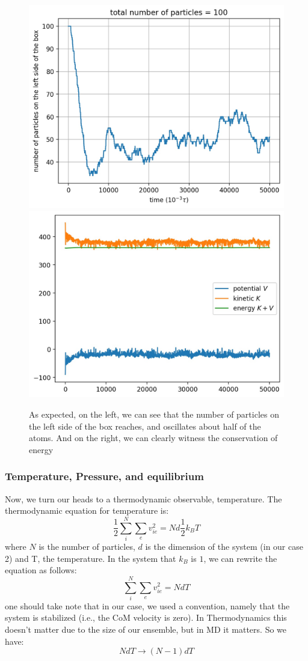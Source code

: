 \documentclass[12pt, a4paper]{article}
\begin{document}
	\begin{figure}[h!]
		\centering
		\includegraphics[width=.45\linewidth]{../results/particles_on_left100_50000.jpg}
		\includegraphics[width=.45\linewidth]{../results/energy_conservation100_50000.jpg}
		\caption{As expected, on the left, we can see that the number of particles on the 
		left side of the box reaches, and oscillates about half of the atoms. And on the right, we
		can clearly witness the conservation of energy}
		\label{fig:energy_and_left}
	\end{figure}

	\subsubsection{Temperature, Pressure, and equilibrium}
	Now, we turn our heads to a thermodynamic observable, temperature. The thermodynamic 
	equation for temperature is:
	\begin{equation}
		\frac{1}{2} \sum_{i}^{N}\sum_{e} v_{ie}^2 = Nd \frac{1}{2}k_B T
	\end{equation}
	where $N$ is the number of particles, $d$ is the dimension of the system (in our case 2) and 
	T, the temperature. In the system that $k_B$ is $1$, we can rewrite the equation as follows:
	\begin{equation}
		\sum_{i}^{N} \sum_{e} v_{ie}^2 = N d T
	\end{equation}
	one should take note that in our case, we used a convention, namely that the system is 
	stabilized (i.e., the CoM velocity is zero). In Thermodynamics this doesn't matter due to the 
	size of our ensemble, but in MD it matters. So we have:
	\begin{equation*}
		N d T \rightarrow (N-1) d T
	\end{equation*}
	
	
	
	
	
\end{document}
